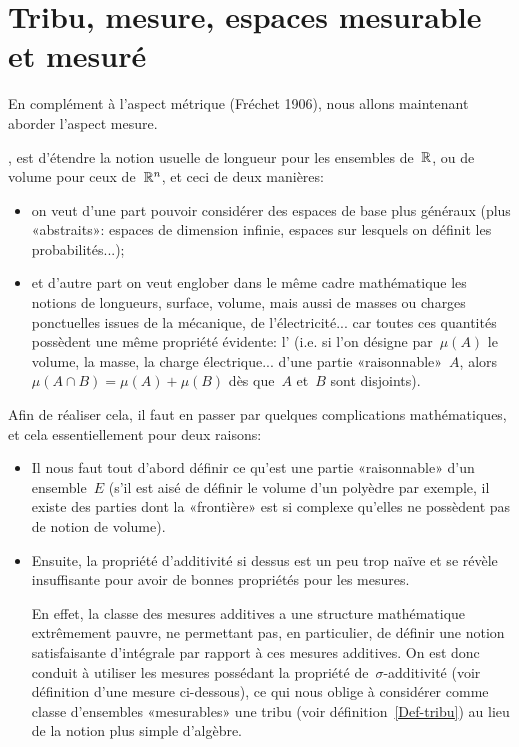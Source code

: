 
\medskip\ifVersionDuDocEstVincent\else\newpage\fi
\section{Tribu, mesure, espaces mesurable et mesuré}\label{Sec-Mesure}

En complément à l'aspect métrique (Fréchet 1906), nous allons maintenant aborder l'aspect mesure.

\medskip
{}, est d'étendre la notion usuelle de longueur pour les ensembles de~$\mathbb R$, ou de volume pour ceux de~$\mathbb R^n$, et ceci de deux manières:
\begin{itemize}
\item on veut d'une part pouvoir considérer des espaces de base plus généraux (plus «abstraits»: espaces de dimension infinie, espaces sur lesquels on définit les probabilités...); 
\item et d'autre part on veut englober dans le même cadre mathématique les notions de longueurs, surface, volume, mais aussi de masses ou charges ponctuelles issues de la mécanique, de l'électricité... car toutes ces quantités possèdent une même propriété évidente: l' (i.e. si l'on désigne par~$\mu(A)$ le volume, la masse, la charge électrique... d'une partie «raisonnable»~$A$, alors~$\mu(A\cap B)=\mu(A)+\mu(B)$ dès que~$A$ et~$B$ sont disjoints).
\end{itemize}

\medskip
Afin de réaliser cela, il faut en passer par quelques complications mathématiques, et cela essentiellement pour deux raisons:
\begin{itemize}
   \item Il nous faut tout d'abord définir ce qu'est une partie «raisonnable» d'un ensemble~$E$ (s'il est aisé de définir le volume d'un polyèdre par exemple, il existe des parties dont la «frontière» est si complexe qu'elles ne possèdent pas de notion de volume).

   \item Ensuite, la propriété d'additivité si dessus est un peu trop naïve et se révèle insuffisante pour avoir de bonnes propriétés pour les mesures.

En effet, la classe des mesures additives a une structure mathématique extrêmement pauvre, ne permettant pas, en particulier, de définir une notion satisfaisante d'intégrale par rapport à ces mesures additives.
On est donc conduit à utiliser les mesures possédant la propriété de~$\sigma$-additivité (voir définition d'une mesure ci-dessous), ce qui nous oblige à considérer comme classe d'ensembles «mesurables» une tribu (voir définition~\ref{Def-tribu}) au lieu de la notion plus simple d'algèbre.
\end{itemize}

